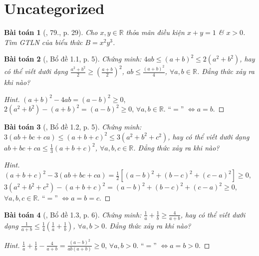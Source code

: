\documentclass{article}
\newtheorem{baitoan}{Bài toán}
\begin{document}

\section{Uncategorized}

\begin{baitoan}[\cite{Tuyen_Toan_9}, 79., p. 29]
	Cho $x,y\in\mathbb{R}$ thỏa mãn điều kiện $x + y = 1$ \& $x > 0$. Tìm {\rm GTLN} của biểu thức $B = x^2y^3$.
\end{baitoan}

\begin{baitoan}[\cite{Son_Nghiep_Trung_Can2021}, Bổ đề 1.1, p. 5]
	Chứng minh: $4ab\le(a + b)^2\le2(a^2 + b^2)$, hay có thể viết dưới dạng $\frac{a^2 + b^2}{2}\ge\left(\frac{a + b}{2}\right)^2$, $ab\le\frac{(a + b)^2}{4}$, $\forall a,b\in\mathbb{R}$. Đẳng thức xảy ra khi nào?
\end{baitoan}

\begin{proof}[Hint]
	$(a + b)^2 - 4ab = (a - b)^2\ge 0$, $2(a^2 + b^2) - (a + b)^2 = (a - b)^2\ge 0$, $\forall a,b\in\mathbb{R}$. ``$=$'' $\Leftrightarrow a = b$.
\end{proof}

\begin{baitoan}[\cite{Son_Nghiep_Trung_Can2021}, Bổ đề 1.2, p. 5]
	Chứng minh: $3(ab + bc + ca)\le(a + b + c)^2\le3(a^2 + b^2 + c^2)$, hay có thể viết dưới dạng $ab + bc + ca\le\frac{1}{3}(a + b + c)^2$, $\forall a,b,c\in\mathbb{R}$. Đẳng thức xảy ra khi nào?
\end{baitoan}

\begin{proof}[Hint]
	$(a + b + c)^2 - 3(ab + bc + ca) = \frac{1}{2}\left[(a - b)^2 + (b - c)^2 + (c - a)^2\right]\ge 0$, $3(a^2 + b^2 + c^2) - (a + b + c)^2 = (a - b)^2 + (b - c)^2 + (c - a)^2\ge 0$, $\forall a,b,c\in\mathbb{R}$. ``$=$'' $\Leftrightarrow a = b = c$.
\end{proof}

\begin{baitoan}[\cite{Son_Nghiep_Trung_Can2021}, Bổ đề 1.3, p. 6]
	Chứng minh: $\frac{1}{a} + \frac{1}{b}\ge\frac{4}{a + b}$, hay có thể viết dưới dạng $\frac{1}{a + b}\le\frac{1}{4}\left(\frac{1}{a} + \frac{1}{b}\right)$, $\forall a,b > 0$. Đẳng thức xảy ra khi nào?
\end{baitoan}

\begin{proof}[Hint]
	$\frac{1}{a} + \frac{1}{b} - \frac{4}{a + b} = \frac{(a - b)^2}{ab(a + b)}\ge 0$, $\forall a,b > 0$. ``$=$'' $\Leftrightarrow a = b > 0$.
\end{proof}
\end{document}
